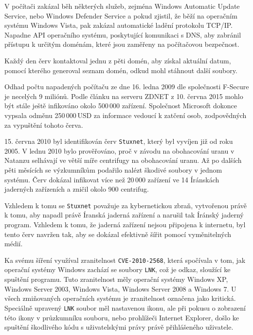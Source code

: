 \documentclass[a4paper,12pt]{article}
\begin{document}
V počítači zakázal běh některých služeb, zejména Windows Automatic Update Service, nebo Windows Defender Service a pokud zjistil, že běží na operačním systému Windows Vista, pak zakázal automatické ladění protokolu TCP/IP. Napadne API operačního systému, poskytující komunikaci s DNS, aby zabránil přístupu k určitým doménám, které jsou zaměřeny na počítačovou bezpečnost.\cite{conficker-fsecure}

Každý den červ kontaktoval jednu z pěti domén, aby získal aktuální datum, pomocí kterého generoval seznam domén, odkud mohl stáhnout další soubory.\cite{conficker-fsecure}

Odhad počtu napadených počítaču ze dne 16. ledna 2009 dle společnosti F-Secure je necelých 9 miliónů\cite{conficker-fsecure2}. Podle článku na serveru ZDNET z 10. června 2015 mohlo být stále ještě infikováno okolo 500\,000 zařízení. Společnost Microsoft dokonce vypsala odměnu 250\,000\,USD za informace vedoucí k zatčení osob, zodpovědných za vypuštění tohoto červa\cite{conficker-zdnet}.

15. června 2010 byl identifikován červ \texttt{Stuxnet}, který byl vyvíjen již od roku 2005. V lednu 2010 bylo prověřováno, proč v závodu na obohacování uranu v Natanzu selhávají ve větší míře centrifugy na obohacování uranu. Až po dalších pěti měsících se výzkumníkům podařilo nalézt škodivé soubory v jednom systému. Červ dokázal infikovat více než 20\,000 zařízení ve 14 Íránskách jaderných zařízeních a zničil okolo 900 centrifug.\cite{stuxnet-nordvpn}

Vzhledem k tomu se \texttt{Stuxnet} považuje za kybernetickou zbraň, vytvořenou právě k tomu, aby napadl právě Íranská jaderná zařízení a narušil tak Íránský jaderný program\cite{stuxnet-avast}. Vzhledem k tomu, že jaderná zařízení nejsou připojena k internetu, byl tento červ navržen tak, aby se dokázal efektivně šířit pomocí vyměnitelných médií\cite{stuxnet-nordvpn}.

Ka svému šíření využíval zranitelnost \texttt{CVE-2010-2568}, která spočívala v tom, jak operační systémy Windows zachází se soubory \texttt{LNK}, což je odkaz, sloužící ke spuštění programu. Tuto zranitelnost měly operační systémy Windows XP, Windows Server 2003, Windows Vista, Windows Server 2008 a Windows 7. U všech zmiňovaných operačních systému je zranitelnost označena jako kritická. Speciálně upravený \texttt{LNK} soubor měl nastavenou ikonu, ale při pokusu o zobrazení této ikony v průzkumníku souboru, nebo prohlížeči Internet Explorer, došlo ke spuštění škodlivého kódu s uživatelskými právy právě přihlášeného uživatele.\cite{stuxnet-ms}
\end{document}
